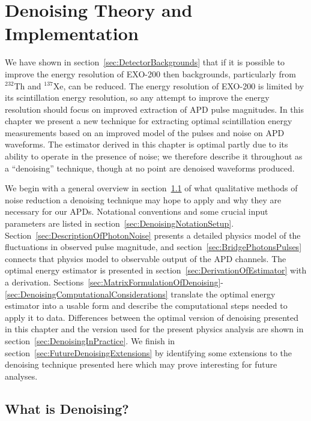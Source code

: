 \renewcommand{\thechapter}{4}
\chapter{Denoising Theory and Implementation}
\label{ch:DenoisingTheory}

We have shown in section~\ref{sec:DetectorBackgrounds} that if it is possible to improve the energy resolution of EXO-200 then backgrounds, particularly from $^{232}$Th and $^{137}$Xe, can be reduced.  The energy resolution of EXO-200 is limited by its scintillation energy resolution, so any attempt to improve the energy resolution should focus on improved extraction of APD pulse magnitudes.  In this chapter we present a new technique for extracting optimal scintillation energy measurements based on an improved model of the pulses and noise on APD waveforms.  The estimator derived in this chapter is optimal partly due to its ability to operate in the presence of noise; we therefore describe it throughout as a ``denoising'' technique, though at no point are denoised waveforms produced.

We begin with a general overview in section~\ref{sec:WhatIsDenoising} of what qualitative methods of noise reduction a denoising technique may hope to apply and why they are necessary for our APDs.  Notational conventions and some crucial input parameters are listed in section~\ref{sec:DenoisingNotationSetup}.  Section~\ref{sec:DescriptionOfPhotonNoise} presents a detailed physics model of the fluctuations in observed pulse magnitude, and section~\ref{sec:BridgePhotonsPulses} connects that physics model to observable output of the APD channels.  The optimal energy estimator is presented in section~\ref{sec:DerivationOfEstimator} with a derivation.  Sections~\ref{sec:MatrixFormulationOfDenoising}-\ref{sec:DenoisingComputationalConsiderations} translate the optimal energy estimator into a usable form and describe the computational steps needed to apply it to data.  Differences between the optimal version of denoising presented in this chapter and the version used for the present physics analysis are shown in section~\ref{sec:DenoisingInPractice}.  We finish in section~\ref{sec:FutureDenoisingExtensions} by identifying some extensions to the denoising technique presented here which may prove interesting for future analyses.

\section{What is Denoising?}\label{sec:WhatIsDenoising}


